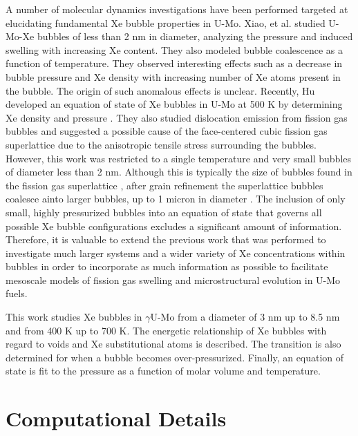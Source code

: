 \documentclass[review]{elsarticle}
\begin{document}
A number of molecular dynamics investigations have been performed targeted at elucidating fundamental Xe bubble properties in U-Mo. Xiao, et al. \cite{xiao2014, xiao2015} studied U-Mo-Xe bubbles of less than 2 nm in diameter, analyzing the pressure and induced swelling with increasing Xe content. They also modeled bubble coalescence as a function of temperature. They observed interesting effects such as a decrease in bubble pressure and Xe density with increasing number of Xe atoms present in the bubble. The origin of such anomalous effects is unclear. Recently, Hu developed an equation of state of Xe bubbles in U-Mo at 500 K by determining Xe density and pressure \cite{hu2017}. They also studied dislocation emission from fission gas bubbles and suggested a possible cause of the face-centered cubic fission gas superlattice due to the anisotropic tensile stress surrounding the bubbles. However, this work was restricted to a single temperature and very small bubbles of diameter less than 2 nm. Although this is typically the size of bubbles found in the fission gas superlattice \cite{kim2011}, after grain refinement the superlattice bubbles coalesce ainto larger bubbles, up to 1 micron in diameter \cite{afip6report}. The inclusion of only small, highly pressurized bubbles into an equation of state that governs all possible Xe bubble configurations excludes a significant amount of information. Therefore, it is valuable to extend the previous work that was performed to investigate much larger systems and a wider variety of Xe concentrations within bubbles in order to incorporate as much information as possible to facilitate mesoscale models of fission gas swelling and microstructural evolution in U-Mo fuels.

This work studies Xe bubbles in $\gamma$U-Mo from a diameter of 3 nm up to 8.5 nm and from 400 K up to 700 K. The energetic relationship of Xe bubbles with regard to voids and Xe substitutional atoms is described. The transition is also determined for when a bubble becomes over-pressurized. Finally, an equation of state is fit to the pressure as a function of molar volume and temperature.

\section{Computational Details}
\end{document}

